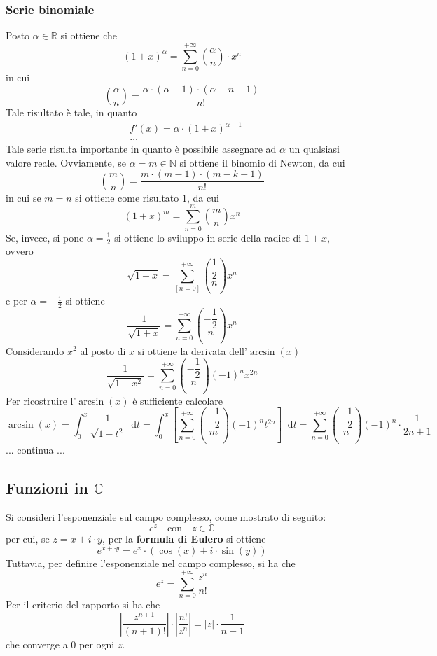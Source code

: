 \documentclass[a4paper]{extarticle}
\newcommand*\dif{\mathop{}\!\mathrm{d}}
\begin{document}
\vspace{1em}
\subsubsection{Serie binomiale}
Posto $\alpha \in \mathbb{R}$ si ottiene che
\[(1+x)^\alpha = \sum_{n=0}^{+\infty} \binom{\alpha}{n} \cdot x^n\]
in cui
\[\binom{\alpha}{n} = \frac{\alpha \cdot (\alpha-1) \cdot (\alpha-n+1)}{n!}\]
Tale risultato è tale, in quanto
\begin{align}
    & f'(x) = \alpha \cdot (1+x)^{\alpha-1}\\
    & \dots
\end{align}
Tale serie risulta importante in quanto è possibile assegnare ad $\alpha$ un qualsiasi valore reale. Ovviamente, se $\alpha = m \in \mathbb{N}$ si ottiene il binomio di Newton, da cui
\[\binom{m}{n} = \frac{m \cdot (m-1) \cdot (m-k+1)}{n!}\]
in cui se $m=n$ si ottiene come risultato $1$, da cui
\[(1+x)^m = \sum_{n=0}^m \binom{m}{n} x^n\]
Se, invece, si pone $\alpha=\frac{1}{2}$ si ottiene lo sviluppo in serie della radice di $1+x$, ovvero
\[\sqrt{1+x}=\sum_[n=0]^{+\infty} \binom{\dfrac{1}{2}}{n} x^n\]
e per $\alpha=-\frac{1}{2}$ si ottiene
\[\frac{1}{\sqrt{1+x}} = \sum_{n=0}^{+\infty} \binom{-\dfrac{1}{2}}{n} x^n\]
Considerando $x^2$ al posto di $x$ si ottiene la derivata dell'$\arcsin(x)$
\[\frac{1}{\sqrt{1-x^2}} = \sum_{n=0}^{+\infty} \binom{-\dfrac{1}{2}}{n} (-1)^n x^{2n}\]
Per ricostruire l'$\arcsin(x)$ è sufficiente calcolare
\[\arcsin(x)=\int_0^x \frac{1}{\sqrt{1-t^2}} \dif t = \int_0^x \left[ \sum_{n=0}^{+\infty} \binom{-\dfrac{1}{2}}{m} (-1)^n t^{2n}\right] \dif t = \sum_{n=0}^{+\infty} \binom{-\dfrac{1}{2}}{n} (-1)^n \cdot \frac{1}{2n+1}\]
... continua ...

\vspace{1em}
\noindent
\subsection{Funzioni in $\mathbb{C}$}
Si consideri l'esponenziale sul campo complesso, come mostrato di seguito:
\[e^z \hspace{1em} \text{con} \hspace{1em} z \in \mathbb{C}\]
per cui, se $z=x+i \cdot y$, per la \textbf{formula di Eulero} si ottiene
\[e^{x+\cdot y} = e^x \cdot \left(\cos(x) + i \cdot \sin(y)\right)\]
Tuttavia, per definire l'esponenziale nel campo complesso, si ha che
\[e^z = \sum_{n=0}^{+\infty} \frac{z^n}{n!}\]
Per il criterio del rapporto si ha che
\[\left \vert \frac{z^{n+1}}{(n+1)!} \right \vert \cdot \left \vert \frac{n!}{z^n} \right \vert = \vert z \vert \cdot \frac{1}{n+1}\]
che converge a $0$ per ogni $z$.
\end{document}

